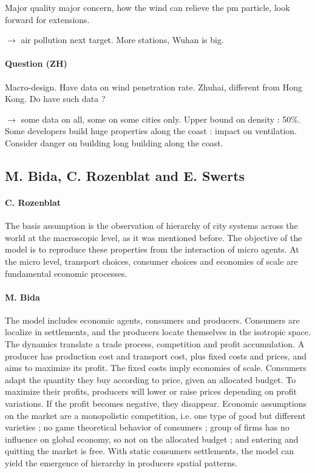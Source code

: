 \documentclass[11pt]{article}
\begin{document}
Major quality major concern, how the wind can relieve the pm particle, look forward for extensions.

$\rightarrow$ air pollution next target. More stations, Wuhan is big.

\paragraph{Question (ZH)}

Macro-design. Have data on wind penetration rate. Zhuhai, different from Hong Kong. Do have such data ?

$\rightarrow$ some data on all, some on some cities only. Upper bound on density : 50\%. Some developers build huge properties along the coast : impact on ventilation. Consider danger on building long building along the coast.



\subsection*{M. Bida, C. Rozenblat and E. Swerts}

\paragraph{C. Rozenblat}

The basis assumption is the observation of hierarchy of city systems across the world at the macroscopic level, as it was mentioned before. The objective of the model is to reproduce these properties from the interaction of micro agents. At the micro level, transport choices, consumer choices and economies of scale are fundamental economic processes.


\paragraph{M. Bida}

The model includes economic agents, consumers and producers. Consumers are localize in settlements, and the producers locate themselves in the isotropic space. The dynamics translate a trade process, competition and profit accumulation. A producer has production cost and transport cost, plus fixed costs and prices, and aims to maximize its profit. The fixed costs imply economies of scale. Consumers adapt the quantity they buy according to price, given an allocated budget. To maximize their profits, producers will lower or raise prices depending on profit variations. If the profit becomes negative, they disappear. Economic assumptions on the market are a monopolistic competition, i.e. one type of good but different varieties ; no game theoretical behavior of consumers ; group of firms has no influence on global economy, so not on the allocated budget ; and entering and quitting the market is free. With static consumers settlements, the model can yield the emergence of hierarchy in producers spatial patterns.
\end{document}
